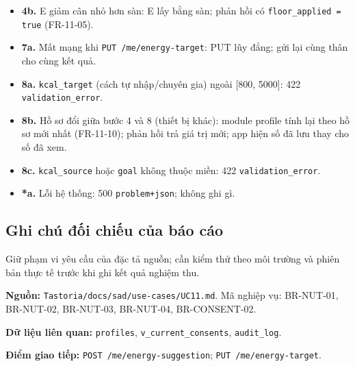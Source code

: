 \begin{itemize}
\item \textbf{4b.} E giảm cân nhỏ hơn sàn: E lấy bằng sàn; phản hồi có {\small\texttt{floor\_\allowbreak{}\allowbreak{}applied = true}} (FR-\allowbreak{}11-\allowbreak{}05).
\item \textbf{7a.} Mất mạng khi {\small\texttt{PUT /\allowbreak{}\allowbreak{}me/\allowbreak{}\allowbreak{}energy-\allowbreak{}target}}: PUT lũy đẳng; gửi lại cùng thân cho cùng kết quả.
\item \textbf{8a.} {\small\texttt{kcal\_\allowbreak{}\allowbreak{}target}} (cách tự nhập/\allowbreak{}chuyên gia) ngoài [800, 5000]: 422 {\small\texttt{validation\_\allowbreak{}\allowbreak{}error}}.
\item \textbf{8b.} Hồ sơ đổi giữa bước 4 và 8 (thiết bị khác): module profile tính lại theo hồ sơ mới nhất (FR-\allowbreak{}11-\allowbreak{}10); phản hồi trả giá trị mới; app hiện số đã lưu thay cho số đã xem.
\item \textbf{8c.} {\small\texttt{kcal\_\allowbreak{}\allowbreak{}source}} hoặc {\small\texttt{goal}} không thuộc miền: 422 {\small\texttt{validation\_\allowbreak{}\allowbreak{}error}}.
\item \textbf{*a.} Lỗi hệ thống: 500 {\small\texttt{problem+json}}; không ghi gì.
\end{itemize}
\subsection{Ghi chú đối chiếu của báo cáo}
Giữ phạm vi yêu cầu của đặc tả nguồn; cần kiểm thử theo môi trường và phiên bản thực tế trước khi ghi kết quả nghiệm thu.

\textbf{Nguồn:} {\small\texttt{Tastoria/\allowbreak{}\allowbreak{}docs/\allowbreak{}\allowbreak{}sad/\allowbreak{}\allowbreak{}use-\allowbreak{}cases/\allowbreak{}\allowbreak{}UC11.\allowbreak{}md}}. Mã nghiệp vụ: BR-\allowbreak{}NUT-\allowbreak{}01, BR-\allowbreak{}NUT-\allowbreak{}02, BR-\allowbreak{}NUT-\allowbreak{}03, BR-\allowbreak{}NUT-\allowbreak{}04, BR-\allowbreak{}CONSENT-\allowbreak{}02.

\textbf{Dữ liệu liên quan:} {\small\texttt{profiles}}, {\small\texttt{v\_\allowbreak{}\allowbreak{}current\_\allowbreak{}\allowbreak{}consents}}, {\small\texttt{audit\_\allowbreak{}\allowbreak{}log}}.

\textbf{Điểm giao tiếp:} {\small\texttt{POST /\allowbreak{}\allowbreak{}me/\allowbreak{}\allowbreak{}energy-\allowbreak{}suggestion}}; {\small\texttt{PUT /\allowbreak{}\allowbreak{}me/\allowbreak{}\allowbreak{}energy-\allowbreak{}target}}.
